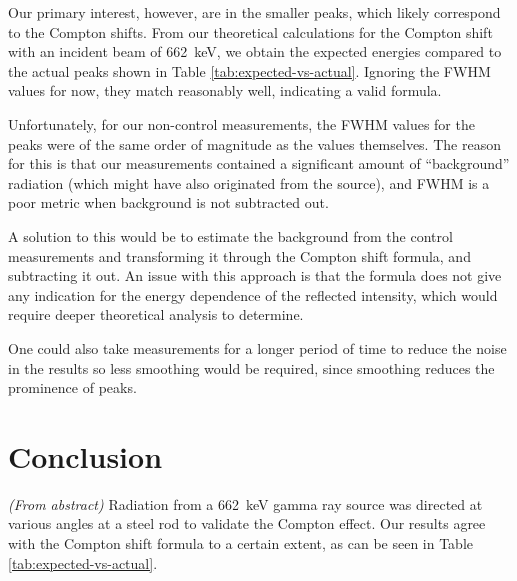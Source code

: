 \documentclass[a4paper]{scrartcl}
\begin{document}
Our primary interest, however, are in the smaller peaks, which likely correspond to the Compton shifts. From our theoretical calculations for the Compton shift with an incident beam of \SI{662}{\kilo\electronvolt}, we obtain the expected energies compared to the actual peaks shown in Table \ref{tab:expected-vs-actual}. Ignoring the FWHM values for now, they match reasonably well, indicating a valid formula.

Unfortunately, for our non-control measurements, the FWHM values for the peaks were of the same order of magnitude as the values themselves. The reason for this is that our measurements contained a significant amount of ``background'' radiation (which might have also originated from the source), and FWHM is a poor metric when background is not subtracted out.

A solution to this would be to estimate the background from the control measurements and transforming it through the Compton shift formula, and subtracting it out. An issue with this approach is that the formula does not give any indication for the energy dependence of the reflected intensity, which would require deeper theoretical analysis to determine.

One could also take measurements for a longer period of time to reduce the noise in the results so less smoothing would be required, since smoothing reduces the prominence of peaks.

\section{Conclusion}
\emph{(From abstract)} Radiation from a \SI{662}{\kilo\electronvolt} gamma ray source was directed at various angles at a steel rod to validate the Compton effect. Our results agree with the Compton shift formula to a certain extent, as can be seen in Table \ref{tab:expected-vs-actual}.
\end{document}
